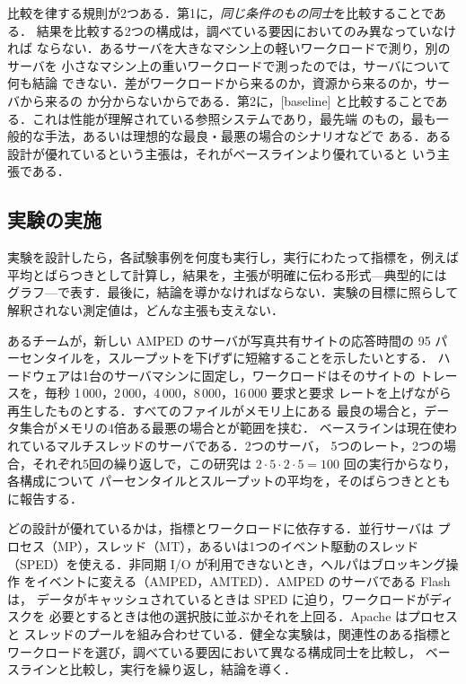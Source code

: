 \documentclass[../main.tex]{subfiles}
\begin{document}
比較を律する規則が2つある．第1に，\emph{同じ条件のもの同士}を比較することである．
結果を比較する2つの構成は，調べている要因においてのみ異なっていなければ
ならない．あるサーバを大きなマシン上の軽いワークロードで測り，別のサーバを
小さなマシン上の重いワークロードで測ったのでは，サーバについて何も結論
できない．差がワークロードから来るのか，資源から来るのか，サーバから来るの
か分からないからである．第2に，[baseline]
と比較することである．これは性能が理解されている参照システムであり，最先端
のもの，最も一般的な手法，あるいは理想的な最良・最悪の場合のシナリオなどで
ある．ある設計が優れているという主張は，それがベースラインより優れていると
いう主張である．%

\subsection{実験の実施}

実験を設計したら，各試験事例を何度も実行し，実行にわたって指標を，例えば
平均とばらつきとして計算し，結果を，主張が明確に伝わる形式---典型的には
グラフ---で表す．最後に，結論を導かなければならない．実験の目標に照らして
解釈されない測定値は，どんな主張も支えない．

\begin{example}
  あるチームが，新しい AMPED のサーバが写真共有サイトの応答時間の 95
  パーセンタイルを，スループットを下げずに短縮することを示したいとする．
  ハードウェアは1台のサーバマシンに固定し，ワークロードはそのサイトの
  トレースを，毎秒 1\,000，2\,000，4\,000，8\,000，16\,000 要求と要求
  レートを上げながら再生したものとする．すべてのファイルがメモリ上にある
  最良の場合と，データ集合がメモリの4倍ある最悪の場合とが範囲を挟む．
  ベースラインは現在使われているマルチスレッドのサーバである．2つのサーバ，
  5つのレート，2つの場合，それぞれ5回の繰り返しで，この研究は
  $2 \cdot 5 \cdot 2 \cdot 5 = 100$ 回の実行からなり，各構成について
  パーセンタイルとスループットの平均を，そのばらつきとともに報告する．
\end{example}

\begin{keypoint}[章のまとめ]
  どの設計が優れているかは，指標とワークロードに依存する．並行サーバは
  プロセス（MP），スレッド（MT），あるいは1つのイベント駆動のスレッド
  （SPED）を使える．非同期 I/O が利用できないとき，ヘルパはブロッキング操作
  をイベントに変える（AMPED，AMTED）．AMPED のサーバである Flash は，
  データがキャッシュされているときは SPED に迫り，ワークロードがディスクを
  必要とするときは他の選択肢に並ぶかそれを上回る．Apache はプロセスと
  スレッドのプールを組み合わせている．健全な実験は，関連性のある指標と
  ワークロードを選び，調べている要因において異なる構成同士を比較し，
  ベースラインと比較し，実行を繰り返し，結論を導く．
\end{keypoint}
\end{document}
